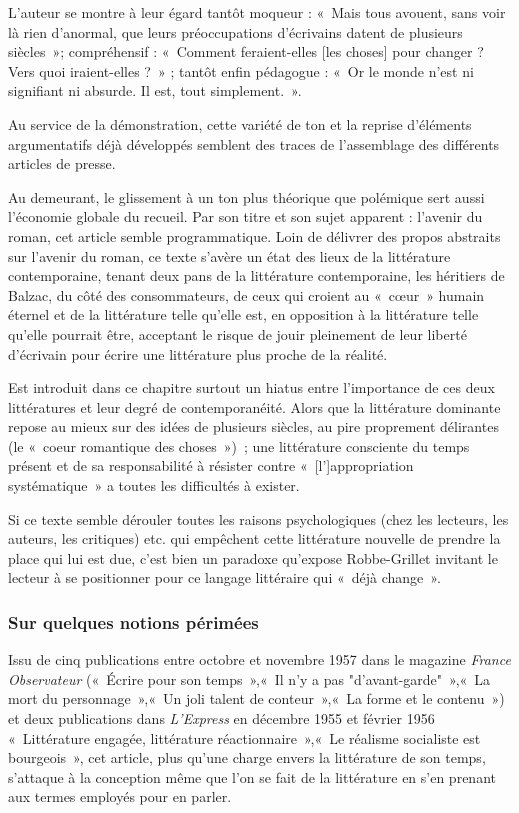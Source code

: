 \documentclass[12pt, a4paper]{article}
\begin{document}
L'auteur se montre à leur égard tantôt moqueur : «~Mais tous avouent, sans voir là rien d'anormal, que leurs préoccupations d'écrivains datent de plusieurs siècles~»; compréhensif : «~Comment feraient-elles [les choses] pour changer ? Vers quoi iraient-elles ?~» ; tantôt enfin pédagogue : «~Or le monde n'est ni signifiant ni absurde. Il est, tout simplement.~».

	
	
Au service de la démonstration, cette variété de ton et la reprise d'éléments argumentatifs déjà développés semblent des traces de l'assemblage des différents articles de presse.

Au demeurant, le glissement à un ton plus théorique que polémique sert aussi l'économie globale du recueil. Par son titre et son sujet apparent : l'avenir du roman, cet article semble programmatique. Loin de délivrer des propos abstraits sur l'avenir du roman, ce texte s'avère un état des lieux de la littérature contemporaine, tenant deux pans de la littérature contemporaine, les héritiers de Balzac, du côté des consommateurs, de ceux qui croient au «~cœur~» humain éternel et de la littérature telle qu'elle est, en opposition à la littérature telle qu'elle pourrait être, acceptant le risque de jouir pleinement de leur liberté d'écrivain pour écrire une littérature plus proche de la réalité.

Est introduit dans ce chapitre surtout un hiatus entre l'importance de ces deux littératures et leur degré de contemporanéité. Alors que la littérature dominante repose au mieux sur des idées de plusieurs siècles, au pire proprement délirantes (le «~coeur romantique des choses~»)~; une littérature consciente du temps présent et de sa responsabilité à résister contre «~[l']appropriation systématique~» a toutes les difficultés à exister.

Si ce texte semble dérouler toutes les raisons psychologiques (chez les lecteurs, les auteurs, les critiques) etc. qui empêchent cette littérature nouvelle de prendre la place qui lui est due, c'est bien un paradoxe qu'expose Robbe-Grillet invitant le lecteur à se positionner pour ce langage littéraire qui «~déjà change~».


\subsubsection{Sur quelques notions périmées}
Issu de cinq publications entre octobre et novembre 1957 dans le magazine \textit{France Observateur} («~Écrire pour son temps~»,«~Il n'y a pas "d'avant-garde"~»,«~La mort du personnage~»,«~Un joli talent de conteur~»,«~La forme et le contenu~») et deux publications dans \textit{L'Express} en décembre 1955 et février 1956 «~Littérature engagée, littérature réactionnaire~»,«~Le réalisme socialiste est bourgeois~», cet article, plus qu'une charge envers la littérature de son temps, s'attaque à la conception même que l'on se fait de la littérature en s'en prenant aux termes employés pour en parler.
\end{document}

